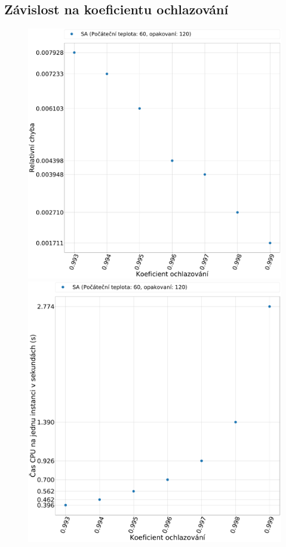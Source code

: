 \documentclass[11pt]{article}
\begin{document}
\subsection{Závislost na koeficientu ochlazování}
\begin{figure}
	\centering
    \begin{minipage}[c]{0.49\textwidth}
        \centering\includegraphics[width=\textwidth]{img/KE.pdf} 
    \end{minipage}
    \begin{minipage}[c]{0.49\textwidth}
        \centering \includegraphics[width=\textwidth]{img/KT.pdf} 

\end{minipage}
\end{figure}
\end{document}
